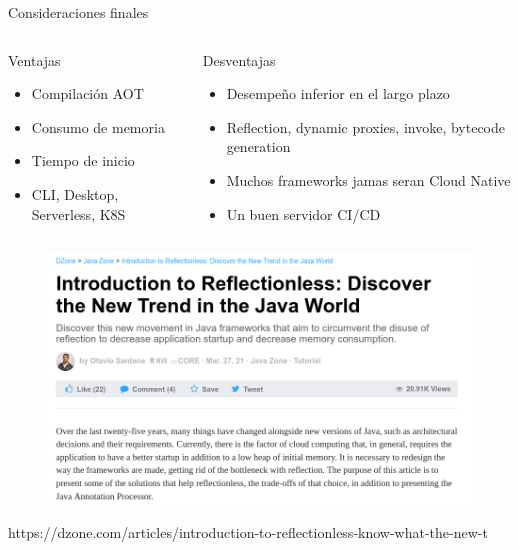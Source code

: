 \documentclass[aspectratio=169]{beamer}
\begin{document}
\begin{frame}{Consideraciones finales}

	\begin{columns}[T] %

		\begin{column}[T]{4cm} %
			\begin{exampleblock}{Ventajas}
				\begin{itemize}
					\item Compilación AOT
					\item Consumo de memoria
					\item Tiempo de inicio
					\item CLI, Desktop, Serverless, K8S
				\end{itemize}
			\end{exampleblock}
		\end{column}
		\begin{column}[T]{6cm} %
			\begin{alertblock}{Desventajas}
				\begin{itemize}
					\item Desempeño inferior en el largo plazo
					\item Reflection, dynamic proxies, invoke, bytecode generation
					\item Muchos frameworks jamas seran Cloud Native
					\item Un buen servidor CI/CD
				\end{itemize}
			\end{alertblock}
		\end{column}
	\end{columns}
\end{frame}


\begin{frame}{}
	\begin{figure}
		\centering
		\includegraphics[width=0.8\linewidth]{Images/otavio}
	\end{figure}
{\tiny https://dzone.com/articles/introduction-to-reflectionless-know-what-the-new-t}
\end{frame}
\end{document}
